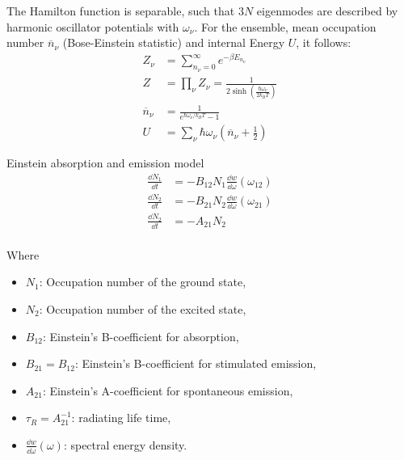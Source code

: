 			\noindent
			The Hamilton function is separable, such that $3N$ eigenmodes are described by harmonic oscillator potentials with $\omega_\nu$. For the ensemble, mean occupation number $\overline{n}_\nu$ (Bose-Einstein statistic) and internal Energy $U$, it follows:
			\begin{equation}
				\begin{aligned}
					Z_\nu &= \sum_{n_\nu=0}^\infty e^{-\beta E_{n_\nu}} \\
					Z &= \prod_\nu Z_\nu = \frac{1}{2\sinh{\left( \frac{\hbar\omega_\nu}{2 k_B T} \right)}} \\
					\overline{n}_\nu &= \frac{1}{e^{\hbar\omega_\nu/k_B T} - 1} \\
					U &= \sum_\nu \hbar\omega_\nu \left(\overline{n}_\nu + \frac{1}{2}\right)
				\end{aligned}
			\end{equation}


			\noindent
			Einstein absorption and emission model
			\begin{equation}
				\begin{aligned}
					\frac{\dd N_1}{\dd t} &= -B_{12}N_1 \frac{\dd w}{\dd \omega}(\omega_{12}) \\
					\frac{\dd N_2}{\dd t} &= -B_{21}N_2 \frac{\dd w}{\dd \omega}(\omega_{21}) \\
					\frac{\dd N_2}{\dd t} &= -A_{21}N_2\\
				\end{aligned}
			\end{equation}

			\noindent
			Where
			\begin{itemize}
  				\setlength\itemsep{0pt}
				\item[] $N_1$: Occupation number of the ground state,
				\item[] $N_2$: Occupation number of the excited state,
				\item[] $B_{12}$: Einstein's B-coefficient for absorption,
				\item[] $B_{21} = B_{12}$: Einstein's B-coefficient for stimulated emission,
				\item[] $A_{21}$: Einstein's A-coefficient for spontaneous emission,
				\item[] $\tau_{R}=A_{21}^{-1}$: radiating life time,
				\item[] $\frac{\dd w}{\dd \omega}(\omega)$: spectral energy density.
			\end{itemize}

